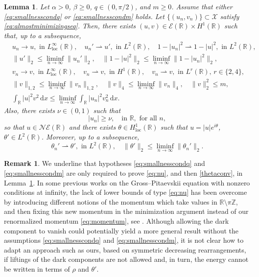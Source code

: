 \documentclass[11pt]{article}
\newcommand{\R}{\mathbb{R}}
\newcommand{\Z}{\mathbb{Z}}
\newcommand{\boE}{\mathcal{E}}
\newcommand{\boX}{\mathcal{X}}
\newcommand{\NE}{\mathcal{NE}(\mathbb{R})}
\renewcommand{\d}{\,\mathrm{d}}
\newcommand{\loc}{\operatorname{loc}}
\theoremstyle{plain}
\newtheorem{lemma}[theorem]{Lemma}
\theoremstyle{definition}
\newtheorem{remark}[theorem]{Remark}
\theoremstyle{remark}
\numberwithin{equation}{section}
\begin{document}
{\begin{lemma}\label{lemma:compactness}
Let $\alpha>0$, $\beta\geq 0$, $q\in (0,\pi/2)$, and $m\geq 0$. Assume that either \eqref{eq:smallnesscondq} or \eqref{eq:smallnesscondm} holds. Let $\{(u_n,v_n)\}\subset\boX$ satisfy \eqref{eq:almostminimizingseq}. Then, there exists $(u,v)\in\boE(\R)\times H^1(\R)$ such that, up to a subsequence,
\begin{align} \label{uconv} 
&u_n\to u, \text{ in }L^\infty_{\loc}(\R),\quad
        u_n'\rightharpoonup u',\text{ in }L^2(\R),\quad 1-|u_n|^2\rightharpoonup 1-|u|^2, \text{ in }L^2(\R),
\\
&\|u'\|_2\leq\liminf_{n\to\infty}\|u_n'\|_2,\quad \|1-|u|^2\|_2\leq\liminf_{n\to\infty}\|1-|u_n|^2\|_2, \label{uconvineq}
\\
&v_n\to v,\text{ in }L^\infty_{\loc}(\R),\quad v_n\rightharpoonup v,\text{ in }H^1(\R),\quad v_n\rightharpoonup v,\text{ in }L^r(\R),\, r\in\{2,4\}, \label{vconv}
\\
&\|v\|_{1,2}\leq\liminf_{n\to\infty}\|v_n\|_{1,2},\quad \|v\|_4\leq\liminf_{n\to\infty}\|v_n\|_4,\quad \|v\|^2_{2}\leq m, \label{vconvineq}
\\
&\int_\R |u|^2 v^2\d x\leq\liminf_{n\to\infty} \int_\R |u_n|^2 v_n^2 \d x.\label{uvconvineq}
    \end{align}
Also, there exists $\nu\in (0,1)$ such that 
\begin{equation}\label{eq:nu}
    |u_n|\geq\nu,\quad\text{in }\R,\text{ for all }n,
\end{equation}
so that $u\in\NE$ and there exists $\theta\in H^1_{\loc}(\R)$ such that $u=|u| e^{i\theta}$, $\theta'\in L^2(\R)$. Moreover, up to a subsequence,
\begin{equation}\label{thetaconv}
\theta_n'\rightharpoonup \theta',\text{ in }L^2(\R),\quad \|\theta'\|_2\leq\liminf_{n\to\infty}\|\theta_n'\|_2.
\end{equation}
\end{lemma}

{

\begin{remark}
    We underline that hypotheses \eqref{eq:smallnesscondq} and \eqref{eq:smallnesscondm} are only required to prove \eqref{eq:nu}, and then \eqref{thetaconv}, in Lemma~\ref{lemma:compactness}. In some previous works on the Gross--Pitaevskii equation with nonzero conditions at infinity, the lack of lower bounds of type \eqref{eq:nu} has been overcome by introducing different notions of the momentum which take values in $\R\setminus\pi\Z$, and then fixing this new momentum in the minimization argument instead of our renormalized momentum \eqref{eq:momentum}, see \cite{orbitalblack,deLaireGravejatSmets2024,deLaireGravejatSmets2025,MarisMur}. Although allowing the dark component to vanish could potentially yield a more general result without the assumptions \eqref{eq:smallnesscondq} and \eqref{eq:smallnesscondm}, it is not clear how to adapt an approach such as ours, based on symmetric decreasing rearrangements, if liftings of the dark components are not allowed and, in turn, the energy cannot be written in terms of $\rho$ and $\theta'$.
\end{remark}
}

}
\end{document}
